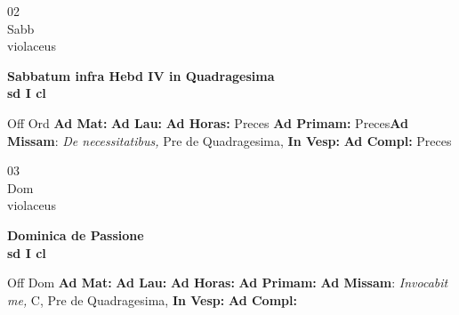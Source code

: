\documentclass[10pt, openany]{book}
\begin{document}
    \begin{center}
        \begin{minipage}{3.5in}
            \vspace{2em}
            \begin{minipage}{0.5in}
                {\Huge 02} \\
                {\normalsize Sabb} \\
                {\normalsize violaceus}
            \end{minipage}
            \begin{minipage}{3.0in}
                \textbf{ \large Sabbatum infra Hebd IV in Quadragesima  \\
                \textnormal{\normalsize sd I cl}} \\ 
            \end{minipage}
            \begin{justify}Off Ord
                \textbf{Ad Mat: }
                \textbf{Ad Lau: }
                \textbf{Ad Horas: }Preces
                \textbf{Ad Primam: }Preces\textbf{Ad Missam}: \textit{De necessitatibus,} Pre de Quadragesima,  
                \textbf{In Vesp: }
                \textbf{Ad Compl: }Preces
            \end{justify}
        \end{minipage}
    \end{center}

    \begin{center}
        \begin{minipage}{3.5in}
            \vspace{2em}
            \begin{minipage}{0.5in}
                {\Huge 03} \\
                {\normalsize Dom} \\
                {\normalsize violaceus}
            \end{minipage}
            \begin{minipage}{3.0in}
                \textbf{ \large Dominica de Passione \\
                \textnormal{\normalsize sd I cl}} \\ 
            \end{minipage}
            \begin{justify}Off Dom
                \textbf{Ad Mat: }
                \textbf{Ad Lau: }
                \textbf{Ad Horas: }
                \textbf{Ad Primam: }\textbf{Ad Missam}: \textit{Invocabit me,} C, Pre de Quadragesima,  
                \textbf{In Vesp: }
                \textbf{Ad Compl: }
            \end{justify}
        \end{minipage}
    \end{center}
\end{document}
